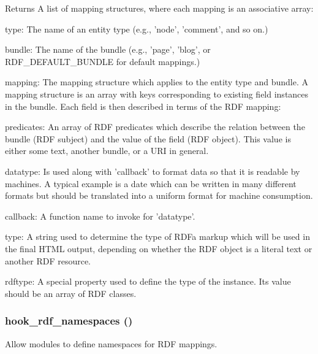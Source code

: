 \begin{DoxyReturn}{Returns}
A list of mapping structures, where each mapping is an associative array:
\begin{DoxyItemize}
\item type: The name of an entity type (e.g., 'node', 'comment', and so on.)
\item bundle: The name of the bundle (e.g., 'page', 'blog', or RDF\_\-DEFAULT\_\-BUNDLE for default mappings.)
\item mapping: The mapping structure which applies to the entity type and bundle. A mapping structure is an array with keys corresponding to existing field instances in the bundle. Each field is then described in terms of the RDF mapping:
\begin{DoxyItemize}
\item predicates: An array of RDF predicates which describe the relation between the bundle (RDF subject) and the value of the field (RDF object). This value is either some text, another bundle, or a URI in general.
\item datatype: Is used along with 'callback' to format data so that it is readable by machines. A typical example is a date which can be written in many different formats but should be translated into a uniform format for machine consumption.
\item callback: A function name to invoke for 'datatype'.
\item type: A string used to determine the type of RDFa markup which will be used in the final HTML output, depending on whether the RDF object is a literal text or another RDF resource.
\item rdftype: A special property used to define the type of the instance. Its value should be an array of RDF classes. 
\end{DoxyItemize}
\end{DoxyItemize}
\end{DoxyReturn}
\hypertarget{group__rdf_ga32e59c5e172304a5f49ec7d76ee6bf3b}{
\subsubsection[{hook\_\-rdf\_\-namespaces}]{\setlength{\rightskip}{0pt plus 5cm}hook\_\-rdf\_\-namespaces ()}}
\label{group__rdf_ga32e59c5e172304a5f49ec7d76ee6bf3b}
Allow modules to define namespaces for RDF mappings.

